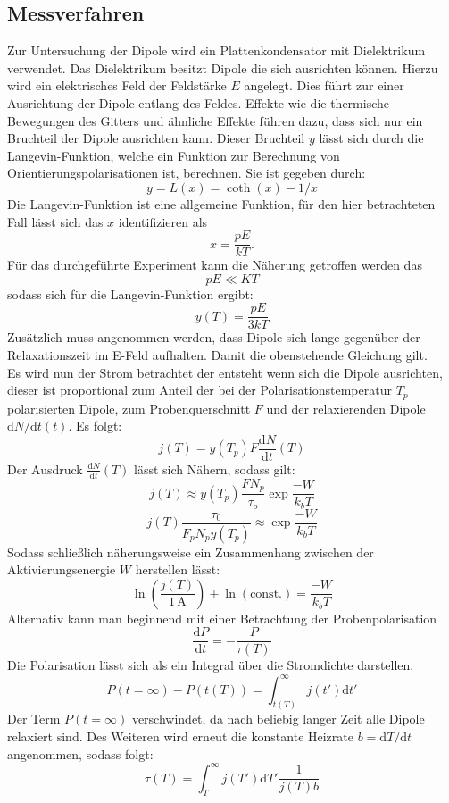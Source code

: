 \subsection{Messverfahren}
Zur Untersuchung der Dipole wird ein Plattenkondensator mit
Dielektrikum verwendet. Das Dielektrikum besitzt Dipole  die sich
ausrichten können. Hierzu wird ein elektrisches
Feld der Feldstärke $E$ angelegt. Dies führt zur einer Ausrichtung der
Dipole entlang des Feldes. Effekte wie die thermische Bewegungen des Gitters und
ähnliche Effekte führen dazu, dass sich nur ein Bruchteil der Dipole ausrichten kann.
Dieser Bruchteil $y$ lässt sich durch die Langevin-Funktion, welche ein
Funktion zur Berechnung von Orientierungspolarisationen ist, berechnen.
Sie ist gegeben durch:
$$y=L(x)=\coth(x)-1/x$$
Die Langevin-Funktion ist eine allgemeine Funktion, für den hier
betrachteten Fall lässt sich das $x$ identifizieren als
$$x=\frac{pE}{kT}.$$
Für das durchgeführte Experiment kann die Näherung getroffen werden das
$$pE \ll KT$$
sodass sich für die Langevin-Funktion ergibt:
$$y(T)=\frac{pE}{3kT}$$
Zusätzlich muss angenommen werden, dass Dipole sich lange gegenüber der
Relaxationszeit im E-Feld aufhalten. Damit die obenstehende Gleichung
gilt.\\
Es wird nun der Strom betrachtet der entsteht wenn sich die Dipole ausrichten,
dieser ist proportional zum Anteil der bei der Polarisationstemperatur $T_p$
 polarisierten Dipole, zum Probenquerschnitt $F$ und der relaxierenden Dipole $\text{d}N/\text{d}t (t)$.
 Es folgt:
$$ j(T)=y(T_p)F \frac{\text{d}N}{\text{d}t}(T)$$
Der Ausdruck $\frac{\text{d}N}{\text{d}t}(T)$ lässt sich Nähern, sodass gilt:
$$j(T)\approx y(T_p)\frac{F N_p}{\tau_o} \exp{\frac{-W}{k_bT}}$$
$$j(T)\frac{\tau_0}{F_p N_p y(T_p)}\approx \exp{\frac{-W}{k_bT}} $$
Sodass schließlich näherungsweise ein Zusammenhang zwischen der Aktivierungsenergie $W$ herstellen lässt:
\begin{equation}
    \label{Formel5}
    \ln (\frac{j(T)}{1\,\text{A}})+ \ln(\text{const}.)=\frac{-W}{k_bT}
\end{equation}
Alternativ kann man beginnend mit einer Betrachtung der Probenpolarisation
$$ \frac{ \text{d}P}{\text{d}t}= - \frac{P}{\tau (T)}$$
Die Polarisation lässt sich als ein Integral über die Stromdichte darstellen.
$$P(t=\infty)-P(t(T))= \int_{t(T)}^{\infty} j(t')\text{d}t'$$
Der Term $P(t=\infty)$ verschwindet, da nach beliebig langer Zeit alle Dipole
relaxiert sind. Des Weiteren wird erneut die konstante Heizrate $b=\text{d}T/\text{d}t$
angenommen, sodass folgt:
$$ \tau(T)=\int_T^\infty j(T')\text{d}T' \frac{1}{j(T)b}$$
